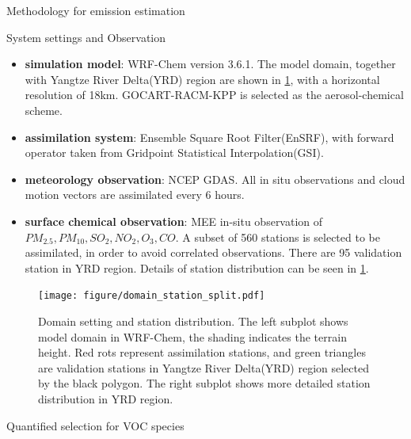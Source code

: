 \documentclass[final]{beamer}
\newlength{\colwidth}
\newlength{\sepparagraph}
\newcommand{\sepnewparagraph}{\vspace{\sepparagraph}}
\begin{document}
\begin{frame}[t]
\begin{columns}[t]
\begin{column}{\colwidth}
\begin{block}{Methodology for emission estimation}
			
				
			\end{block}

            \begin{block}{System settings and Observation}
                \begin{itemize}
					\item \textbf{simulation model}: WRF-Chem version 3.6.1. The model domain, together with Yangtze River Delta(YRD) region are shown in \cref{fig1},  with a horizontal resolution of 18km. GOCART-RACM-KPP is selected as the aerosol-chemical scheme. 

					\item \textbf{assimilation system}: Ensemble Square Root Filter(EnSRF), with forward operator taken from Gridpoint Statistical Interpolation(GSI). 
                    \sepnewparagraph
					\item \textbf{meteorology observation}: NCEP GDAS. All in situ observations and cloud motion vectors are assimilated every 6 hours. 
     
					\item \textbf{surface chemical observation}: MEE in-situ observation of $PM_{2.5}, PM_{10}, SO_2, NO_2, O_3, CO$. A subset of 560 stations is selected to be assimilated, in order to avoid correlated observations. There are 95 validation station in YRD region. Details of station distribution can be seen in \cref{fig1}.
     

     
				\end{itemize}
                \begin{figure}
                    \centerline{\texttt{[image: figure/domain\_station\_split.pdf]}}
                    \caption{Domain setting and station distribution. The left subplot shows model domain in WRF-Chem, the shading indicates the terrain height. Red rots represent assimilation stations, and green triangles are validation stations in Yangtze River Delta(YRD) region selected by the black polygon. The right subplot shows more detailed station distribution in YRD region.  }\label{fig1}
                \end{figure}

			\end{block}
   
			\begin{block}{Quantified selection for VOC species}

				

                \begin{figure}


\end{figure}
\end{block}
\end{column}
\end{columns}
\end{frame}
\end{document}
